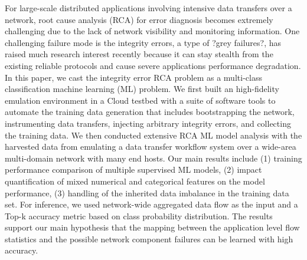 For large-scale distributed applications involving intensive data transfers over a network, root cause analysis (RCA) for error diagnosis becomes extremely challenging due to the lack of network visibility and monitoring information.
One challenging failure mode is the integrity errors, a type of ?grey failures?, has raised much research interest recently because it can stay stealth from the existing reliable protocols and cause severe applications performance degradation.
In this paper, we cast the integrity error RCA problem as a multi-class classification machine learning (ML) problem. We first built an high-fidelity emulation environment in a Cloud testbed with a suite of software tools to automate the training data generation that includes bootstrapping the network, instrumenting data transfers, injecting arbitrary integrity errors, and collecting the training data. 
We then conducted extensive RCA ML model analysis with the harvested data from emulating a data transfer workflow system over a wide-area multi-domain network with many end hosts. Our main results include (1) training performance comparison of multiple supervised ML models, (2) impact quantification of mixed numerical and categorical features on the model performance, (3) handling of the inherited data imbalance in the training data set. For inference, we used network-wide aggregated data flow as the input and a Top-k accuracy metric based on class probability distribution. The results support our main hypothesis that the mapping between the application level flow statistics and the possible network component failures can be learned with high accuracy.
